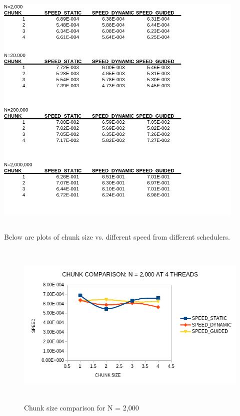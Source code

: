 \documentclass[12pt]{article}
\begin{document}
        \begin{center}	
            \includegraphics[width = 120mm,height = 120mm]{result_chunk.png}
        \end{center}

        Below are plots of chunk size vs. different speed from different schedulers. 

        \begin{figure}[H]
            \hfill\includegraphics[width=150mm,height= 80mm]{chunk_2e3.png}\hspace*{\fill}
            \caption{Chunk size comparison for N = 2,000}
        \end{figure}  
\end{document}
